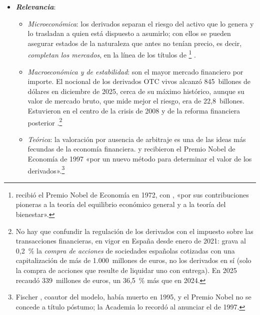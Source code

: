 \documentclass[11pt]{article}
\begin{document}
\begin{itemize}
\item \textbf{\emph{Relevancia}}:
  \begin{itemize}
  \item \emph{Microeconómica}: los derivados separan el riesgo del activo que lo genera y lo trasladan a quien está dispuesto a asumirlo; con ellos se pueden asegurar estados de la naturaleza que antes no tenían precio, es decir, \emph{completan los mercados}\nocite{Ross1976Options}, en la línea de los títulos de \footnote{ recibió el Premio Nobel de Economía en 1972, con , «por sus contribuciones pioneras a la teoría del equilibrio económico general y a la teoría del bienestar»\nocite{Nobel1972HicksArrow}.} .
  \item \emph{Macroeconómica y de estabilidad}: son el mayor mercado financiero por importe. El nocional de los derivados OTC vivos alcanzó 845~billones de dólares en diciembre de 2025, cerca de su máximo histórico, aunque su valor de mercado bruto, que mide mejor el riesgo, era de 22,8~billones\nocite{BIS2026OTCDerivados,ISDA2026KeyTrends}. Estuvieron en el centro de la crisis de 2008 y de la reforma financiera posterior  .\footnote{No hay que confundir la regulación de los derivados con el impuesto sobre las transacciones financieras, en vigor en España desde enero de 2021: grava al 0,2~\% la \emph{compra de acciones} de sociedades españolas cotizadas con una capitalización de más de 1.000~millones de euros\nocite{BOE2020ITF}, no los derivados en sí (solo la compra de acciones que resulte de liquidar uno con entrega). En 2025 recaudó 339~millones de euros, un 36,5~\% más que en 2024\nocite{AEAT2026Recaudacion}.}
  \item \emph{Teórica}: la valoración por ausencia de arbitraje es una de las ideas más fecundas de la economía financiera.  y  recibieron el Premio Nobel de Economía de 1997 «por un nuevo método para determinar el valor de los derivados»\nocite{Nobel1997Prensa}.\footnote{Fischer , coautor del modelo, había muerto en 1995, y el Premio Nobel no se concede a título póstumo; la Academia lo recordó al anunciar el de 1997\nocite{Nobel1997Prensa}.}
  \end{itemize}


\end{itemize}
\end{document}
